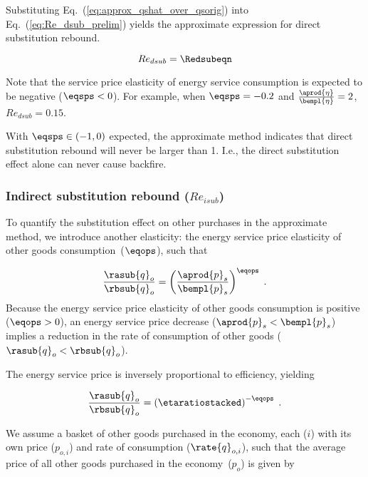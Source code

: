 Substituting Eq.~(\ref{eq:approx_qshat_over_qsorig}) into Eq.~(\ref{eq:Re_dsub_prelim})
yields the approximate expression for direct substitution rebound.

\begin{equation} \label{eq:Re_dsub_approx}
  Re_{dsub} = \Redsubeqn
\end{equation}

Note that the service price elasticity of energy service consumption is
expected to be negative ($\eqsps < 0$).
For example, when $\eqsps = -0.2$ and $\frac{\aprod{\eta}}{\bempl{\eta}} = 2$,
$Re_{dsub} = 0.15$.

With $\eqsps \in (-1, 0)$ expected,
the approximate method indicates that
direct substitution rebound will never be larger than 1.
I.e., the direct substitution effect alone
can never cause backfire. 


\subsubsection{Indirect substitution rebound ($Re_{isub}$)} 
\label{sec:Reisub_approx}

To quantify the substitution effect on other purchases in the approximate method,
we introduce another elasticity:
the energy service price elasticity of other goods consumption~($\eqops$), 
such that

\begin{equation}
  \frac{\rasub{q}_o}{\rbsub{q}_o} = \left( \frac{\aprod{p}_s}{\bempl{p}_s} \right) ^ {\eqops} \; .
\end{equation}
%
Because the energy service price elasticity of other goods consumption
is positive ($\eqops > 0$),
an energy service price decrease ($\aprod{p}_s < \bempl{p}_s$)
implies a reduction in the rate of consumption of other goods ($\rasub{q}_o < \rbsub{q}_o$).

The energy service price is inversely proportional to 
efficiency, yielding

\begin{equation} \label{eq:qohat_qostar}
  \frac{\rasub{q}_o}{\rbsub{q}_o} = \left( \etaratiostacked \right) ^ {-\eqops} \; .
\end{equation}

We assume a basket of other goods purchased in the economy,
each ($i$) with its own price ($p_{o,i}$) and rate of consumption ($\rate{q}_{o,i}$),
such that the average price of all other goods purchased in the economy~($p_o$) is given by

